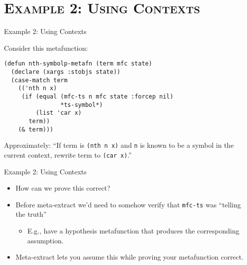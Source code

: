 \section[\scshape Example 2]{\scshape Example 2: Using Contexts}
\begin{frame}[fragile]{Example 2: Using Contexts}

Consider this metafunction:
\begin{Verbatim}[frame=none, framesep=5pt]
(defun nth-symbolp-metafn (term mfc state)
  (declare (xargs :stobjs state))
  (case-match term
    (('nth n x)
     (if (equal (mfc-ts n mfc state :forcep nil)
                *ts-symbol*)
         (list 'car x)
       term))
    (& term)))
\end{Verbatim}
Approximately: ``If term is \verb|(nth n x)| and \verb|n| is
known to be a symbol in the current context, rewrite term to
\verb|(car x)|.''

\end{frame}

\begin{frame}[fragile]{Example 2: Using Contexts}
\begin{itemize}
\item How can we prove this correct?
\item Before meta-extract we'd need to somehow verify that \texttt{mfc-ts} was ``telling the truth''
  \begin{itemize}
  \item E.g., have a hypothesis metafunction that produces the corresponding assumption.
  \end{itemize}
\item Meta-extract lets you assume this while proving your metafunction correct.
\end{itemize}
\end{frame}

